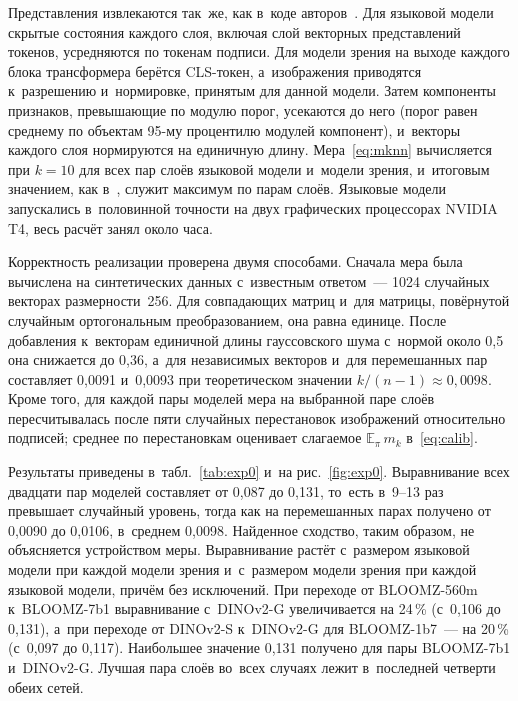 \documentclass[a4paper,12pt]{article}
\begin{document}
Представления извлекаются так~же, как в~коде авторов~\cite{huh2024platonic}. Для
языковой модели скрытые состояния каждого слоя, включая слой векторных представлений
токенов, усредняются по токенам подписи. Для модели зрения на выходе каждого блока
трансформера берётся CLS-токен, а~изображения приводятся к~разрешению и~нормировке,
принятым для данной модели. Затем компоненты признаков, превышающие по модулю порог,
усекаются до него (порог равен среднему по объектам 95-му процентилю модулей компонент),
и~векторы каждого слоя нормируются на единичную длину. Мера~\eqref{eq:mknn} вычисляется
при $k=10$ для всех пар слоёв языковой модели и~модели зрения, и~итоговым значением,
как в~\cite{huh2024platonic}, служит максимум по парам слоёв. Языковые модели запускались
в~половинной точности на двух графических процессорах NVIDIA T4, весь расчёт занял
около часа.

Корректность реализации проверена двумя способами. Сначала мера была вычислена
на синтетических данных с~известным ответом~--- 1024 случайных векторах
размерности~256. Для совпадающих матриц и~для матрицы, повёрнутой случайным
ортогональным преобразованием, она равна единице. После добавления к~векторам единичной
длины гауссовского шума с~нормой около 0,5 она снижается до 0,36, а~для независимых
векторов и~для перемешанных пар составляет 0,0091 и~0,0093 при теоретическом значении
$k/(n-1)\approx0{,}0098$. Кроме того, для каждой пары моделей мера на выбранной паре
слоёв пересчитывалась после пяти случайных перестановок изображений относительно
подписей; среднее по перестановкам оценивает слагаемое $\mathbb{E}_{\pi}\,m_k$
в~\eqref{eq:calib}.

Результаты приведены в~табл.~\ref{tab:exp0} и~на рис.~\ref{fig:exp0}. Выравнивание всех
двадцати пар моделей составляет от 0,087 до 0,131, то~есть в~9--13 раз превышает
случайный уровень, тогда как на перемешанных парах получено от 0,0090 до 0,0106,
в~среднем 0,0098. Найденное сходство, таким образом, не объясняется устройством меры.
Выравнивание растёт с~размером языковой модели при каждой модели зрения и~с~размером
модели зрения при каждой языковой модели, причём без исключений. При переходе
от \mbox{BLOOMZ-560m} к~\mbox{BLOOMZ-7b1} выравнивание с~\mbox{DINOv2-G} увеличивается на 24\,\% (с~0,106
до 0,131), а~при переходе от \mbox{DINOv2-S} к~\mbox{DINOv2-G} для \mbox{BLOOMZ-1b7}~--- на 20\,\% (с~0,097
до 0,117). Наибольшее значение 0,131 получено для пары \mbox{BLOOMZ-7b1} и~\mbox{DINOv2-G}. Лучшая
пара слоёв во~всех случаях лежит в~последней четверти обеих сетей.
\end{document}
